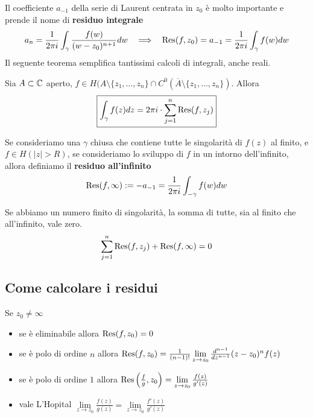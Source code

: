 Il coefficiente $a_{- 1}$ della serie di Laurent centrata in $z_{0}$ è molto importante e prende il nome di \textbf{residuo integrale}
\begin{equation*}
a_{n} = \frac{1}{2\pi i}\int_{\gamma}\frac{f(w)}{(w - z_{0})^{n + 1}} dw\ \ \implies \ \ \operatorname{Res} (f, z_{0}) = a_{- 1} = \frac{1}{2\pi i}\int_{\gamma} f(w) dw
\end{equation*}
Il seguente teorema semplifica tantissimi calcoli di integrali, anche reali.
\begin{thm}
Sia $A\subset \mathbb{C}$ aperto, $f\in H(A\setminus \{z_{1}, \dotsc, z_{n}\} \cap C^{0}(\overline{A} \setminus \{z_{1}, \dotsc, z_{n}\})$. Allora
\begin{equation*}
\boxed{\int_{\gamma} f(z) dz = 2\pi i\cdot \sum\limits^{n}_{j = 1}\operatorname{Res} (f, z_{j})}
\end{equation*}
\end{thm}
\begin{defn}
Se consideriamo una $\gamma $ chiusa che contiene tutte le singolarità di $f(z)$ al finito, e $f\in H(| z| > R)$, se consideriamo lo sviluppo di $f$ in un intorno dell'infinito, allora definiamo il \textbf{residuo all'infinito}
\begin{equation*}
\operatorname{Res} (f, \infty) : = - a_{- 1} = \frac{1}{2\pi i}\int_{- \gamma} f(w) dw
\end{equation*}
\end{defn}
\begin{thm}
Se abbiamo un numero finito di singolarità, la somma di tutte, sia al finito che all'infinito, vale zero.
\begin{equation*}
\sum\limits^{n}_{j = 1}\operatorname{Res} (f, z_{j}) + \operatorname{Res} (f, \infty) = 0
\end{equation*}
\end{thm}

\subsection{Come calcolare i residui}

Se $z_{0} \neq \infty $
\begin{itemize}
\item se è eliminabile allora $\operatorname{Res} (f, z_{0}) = 0$
\item se è polo di ordine $n$ allora $\operatorname{Res} (f, z_{0}) = \frac{1}{(n - 1)!}\lim\limits_{z\rightarrow z_{0}}\frac{d^{n - 1}}{dz^{n - 1}}(z - z_0)^n f(z)$
\item se è polo di ordine $1$ allora $\operatorname{Res} \left(\frac{f}{g}, z_{0}\right) = \lim\limits_{z\rightarrow z_{0}}\frac{f(z)}{g'(z)}$
\item vale L'Hopital $\lim\limits_{z\rightarrow z_{0}}\frac{f(z)}{g(z)} = \lim\limits_{z\rightarrow z_{0}}\frac{f'(z)}{g'(z)}$
\end{itemize}

